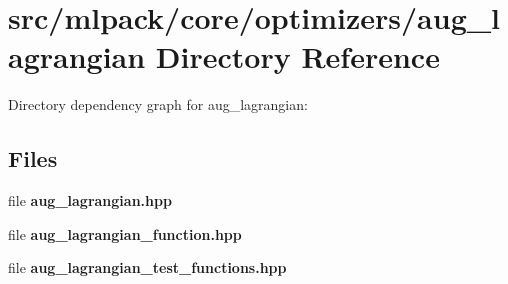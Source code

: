 \section{src/mlpack/core/optimizers/aug\-\_\-lagrangian Directory Reference}
\label{dir_c8df8996edc1870076bedbb0aeba2fd3}
Directory dependency graph for aug\-\_\-lagrangian\-:
\subsection*{Files}
\begin{DoxyCompactItemize}
\item 
file {\bf aug\-\_\-lagrangian.\-hpp}
\item 
file {\bf aug\-\_\-lagrangian\-\_\-function.\-hpp}
\item 
file {\bf aug\-\_\-lagrangian\-\_\-test\-\_\-functions.\-hpp}
\end{DoxyCompactItemize}
